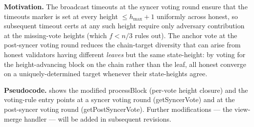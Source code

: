 \ifx\litemode\undefined\documentclass{article}\fi
\newcommand{\hmax}{\ensuremath{h_{\max}}\xspace}
\newcommand{\processBlock}{\textsf{processBlock}\xspace}
\newcommand{\getSyncerVote}{\textsf{getSyncerVote}\xspace}
\newcommand{\getPostSyncerVote}{\textsf{getPostSyncerVote}\xspace}
\renewcommand{\paragraph}[1]{\vspace{7pt}\noindent\textbf{#1}}
\theoremstyle{plain}
\theoremstyle{definition}
\theoremstyle{remark}
\begin{document}
\paragraph{Motivation.}
The broadcast timeouts at the syncer voting round ensure that the timeouts marker is set at every height $\leq \hmax+1$ uniformly across honest, so subsequent timeout certs at any such height require only adversary contribution at the missing-vote heights (which $f < n/3$ rules out).
The anchor vote at the post-syncer voting round reduces the chain-target diversity that can arise from honest validators having different \emph{leaves} but the same state-height: by voting for the height-advancing block on the chain rather than the leaf, all honest converge on a uniquely-determined target whenever their state-heights agree.

\paragraph{Pseudocode.}
 shows the modified \processBlock{} (per-vote height closure) and the voting-rule entry points at a syncer voting round (\getSyncerVote{}) and at the post-syncer voting round (\getPostSyncerVote{}). Further modifications --- the view-merge handler --- will be added in subsequent revisions.
\end{document}
